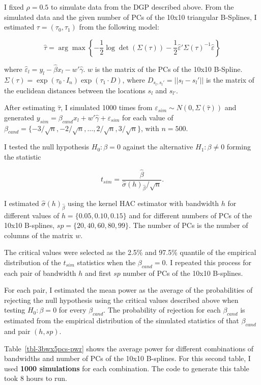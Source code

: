 \documentclass[
]{article}
\begin{document}
I fixed \(\rho=0.5\) to simulate data from the DGP described above. From
the simulated data and the given number of PCs of the 10x10 triangular
B-Splines, I estimated \(\tau = (\tau_0, \tau_1)\) from the following
model:

\[
  \hat\tau = \arg \max \left\{ -\frac{1}{2} \log\det(\Sigma(\tau))-\frac{1}{2}\hat\varepsilon'\Sigma(\tau)^{-1}\hat\varepsilon \right\}
\]

where \(\hat\varepsilon_l = y_l - \hat\beta x_l-w'\hat\gamma\). \(w\) is
the matrix of the PCs of the 10x10 B-Spline.
\(\Sigma(\tau)=\exp(\tau_0\cdot I_n)\exp(\tau_1\cdot D)\), where
\(D_{s_l,s_l'}=||s_l - s_l'||\) is the matrix of the euclidean distances
between the locations \(s_l\) and \(s_{l'}\).

After estimating \(\hat\tau\), I simulated 1000 times from
\(\varepsilon_{sim} \sim N(0,\Sigma(\hat\tau))\) and generated
\(y_{sim }= \beta_{cand} x_l  + w'\hat\gamma + \varepsilon_{sim}\) for
each value of
\(\beta_{cand} = \{-3/\sqrt{n}, -2/\sqrt{n}, \dots, 2/\sqrt{n}, 3/\sqrt{n}\}\),
with \(n=500\).

I tested the null hypothesis \(H_0: \beta = 0\) against the alternative
\(H_1: \beta \not= 0\) forming the statistic

\[
t_{sim} = \frac{\hat\beta}{\hat\sigma(h)_{\hat\beta}/\sqrt{n}} .
\]

I estimated \(\hat\sigma(h)_{\hat\beta}\) using the kernel HAC estimator
with bandwidth \(h\) for different values of \(h=\{0.05, 0.10, 0.15\}\)
and for different numbers of PCs of the 10x10 B-splines,
\(sp = \{20, 40, 60, 80, 99\}\). The number of PCs is the number of
columns of the matrix \(w\).

The critical values were selected as the 2.5\% and 97.5\% quantile of
the empirical distribution of the \(t_{sim}\) statistics when the
\(\beta_{cand} = 0\). I repeated this process for each pair of bandwidth
\(h\) and first \(sp\) number of PCs of the 10x10 B-splines.

For each pair, I estimated the mean power as the average of the
probabilities of rejecting the null hypothesis using the critical values
described above when testing \(H_0: \beta = 0\) for every
\(\beta_{cand}\). The probability of rejection for each \(\beta_{cand}\)
is estimated from the empirical distribution of the simulated statistics
of that \(\beta_{cand}\) and pair \((h,sp)\).

Table~\ref{tbl-3bwx5pcs-pwr} shows the average power for different
combinations of bandwidths and number of PCs of the 10x10 B-splines. For
this second table, I used \textbf{1000 simulations} for each
combination. The code to generate this table took 8 hours to run.
\end{document}
